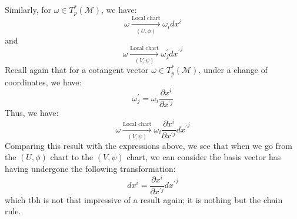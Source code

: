         Similarly, for $\omega \in T_p^*(\mathcal{M})$, we have:
        \begin{equation*}
          \omega \xrightarrow[(U,\phi)]{\text{Local chart}} \omega_i dx^i
        \end{equation*}
        and 
        \begin{equation*}
          \omega \xrightarrow[(V,\psi)]{\text{Local chart}} \omega^\prime_j {dx^\prime}^j
        \end{equation*}
        Recall again that for a cotangent vector $\omega \in
        T_p^*(\mathcal{M})$, under a change of coordinates, we have:
        \[\omega^\prime_{j} = \omega_{i} \frac{\partial x^i}{\partial x^{\prime j}}\]
        Thus, we have:
        \begin{equation*}
          \omega \xrightarrow[(V,\psi)]{\text{Local chart}} \omega_{i} \frac{\partial x^i}{\partial x^{\prime j}} {dx^\prime}^j
        \end{equation*}
        Comparing this result with the expressions above,
        we see that when we
        go from the $(U,\phi)$ chart to the $(V,\psi)$ chart, we can consider
        the basis vector has having undergone the following transformation:
        \begin{equation}
          \label{eqn: transformation property of basis vector part 4}
            dx^i = \frac{\partial x^i}{\partial x^{\prime j}} {dx^\prime}^j
        \end{equation}
        which tbh is not that impressive of a result again; it is nothing but
        the chain rule.

